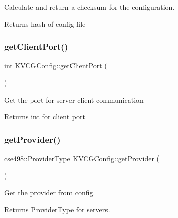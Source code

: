Calculate and return a checksum for the configuration.

\begin{DoxyReturn}{Returns}
hash of config file 
\end{DoxyReturn}
\mbox{\label{classKVCGConfig_a4c25599c2f79b6ad5acd5e03526864be}} 
\subsubsection{\texorpdfstring{get\+Client\+Port()}{getClientPort()}}
{\footnotesize\ttfamily int K\+V\+C\+G\+Config\+::get\+Client\+Port (\begin{DoxyParamCaption}{ }\end{DoxyParamCaption})\hspace{0.3cm}{\ttfamily [inline]}}

Get the port for server-\/client communication

\begin{DoxyReturn}{Returns}
int for client port 
\end{DoxyReturn}
\mbox{\label{classKVCGConfig_a66862a874ddbbe54e7b696894b970539}} 
\subsubsection{\texorpdfstring{get\+Provider()}{getProvider()}}
{\footnotesize\ttfamily cse498\+::\+Provider\+Type K\+V\+C\+G\+Config\+::get\+Provider (\begin{DoxyParamCaption}{ }\end{DoxyParamCaption})\hspace{0.3cm}{\ttfamily [inline]}}

Get the provider from config.

\begin{DoxyReturn}{Returns}
Provider\+Type for servers. 
\end{DoxyReturn}
\mbox{\label{classKVCGConfig_a260449f62666e968566716e2ea2c47c2}} 
